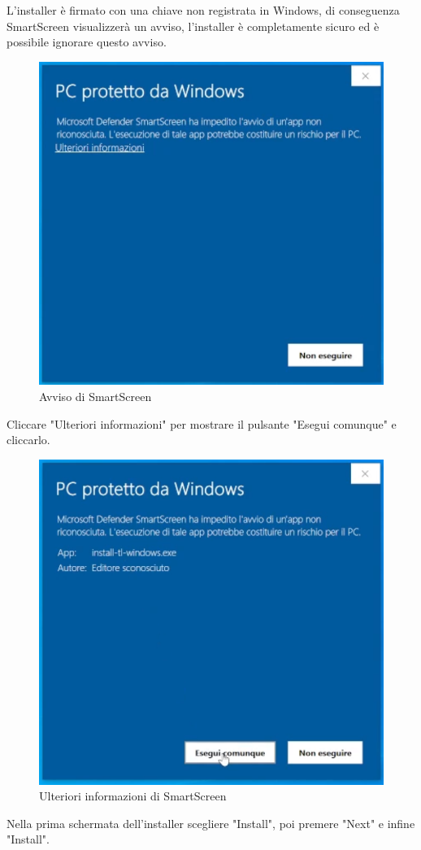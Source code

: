 \documentclass[envcountsame,envcountchap]{svmono}
\begin{document}
L'installer è firmato con una chiave non registrata in Windows, di conseguenza SmartScreen visualizzerà un avviso,
l'installer è completamente sicuro ed è possibile ignorare questo avviso.
\begin{figure}[H]
    \centering
    \includegraphics[width=0.5\linewidth]{images/texlive/win/1_smart_screen.png}
    \caption{Avviso di SmartScreen}
    \label{avviso_smart_screen}
\end{figure}
Cliccare "Ulteriori informazioni" per mostrare il pulsante "Esegui comunque" e cliccarlo.
\begin{figure}[H]
    \centering
    \includegraphics[width=0.5\linewidth]{images/texlive/win/2_smart_screen_2.png}
    \caption{Ulteriori informazioni di SmartScreen}
    \label{info_smart_screen}
\end{figure}
Nella prima schermata dell'installer scegliere "Install", poi premere "Next" e infine "Install".
\end{document}
